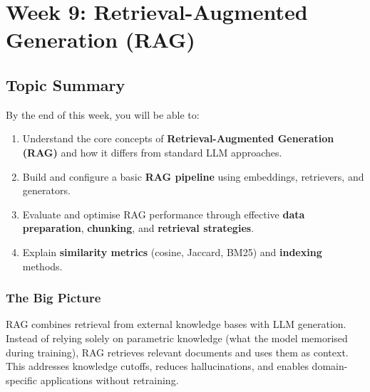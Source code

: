 \section{Week 9: Retrieval-Augmented Generation (RAG)}

\subsection{Topic Summary}

\begin{keybox}
By the end of this week, you will be able to:
\begin{enumerate}
  \item Understand the core concepts of \textbf{Retrieval-Augmented Generation (RAG)} and how it differs from standard LLM approaches.
  \item Build and configure a basic \textbf{RAG pipeline} using embeddings, retrievers, and generators.
  \item Evaluate and optimise RAG performance through effective \textbf{data preparation}, \textbf{chunking}, and \textbf{retrieval strategies}.
  \item Explain \textbf{similarity metrics} (cosine, Jaccard, BM25) and \textbf{indexing} methods.
\end{enumerate}
\end{keybox}

\separator

\subsubsection*{The Big Picture}

RAG combines retrieval from external knowledge bases with LLM generation. Instead of relying solely on parametric knowledge (what the model memorised during training), RAG retrieves relevant documents and uses them as context. This addresses knowledge cutoffs, reduces hallucinations, and enables domain-specific applications without retraining.

\separator

